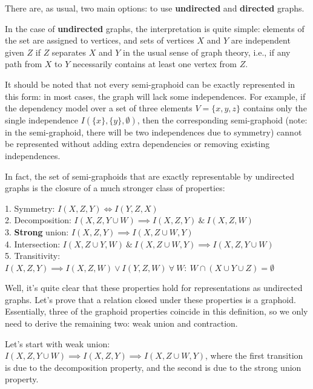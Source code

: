 \documentclass[fleqn]{article}
\numberwithin{equation}{section}
\numberwithin{theorem}{section}
\numberwithin{figure}{section}
\numberwithin{lemma}{section}
\numberwithin{corollary}{section}
\begin{document}
There are, as usual, two main options: to use \textbf{undirected} and \textbf{directed} graphs.

In the case of \textbf{undirected} graphs, the interpretation is quite simple: elements of the set are assigned to vertices, and sets of vertices \( X \) and \( Y \) are independent given \( Z \) if \( Z \) separates \( X \) and \( Y \) in the usual sense of graph theory, i.e., if any path from \( X \) to \( Y \) necessarily contains at least one vertex from \( Z \).

It should be noted that not every semi-graphoid can be exactly represented in this form: in most cases, the graph will lack some independences. For example, if the dependency model over a set of three elements \( V = \{x, y, z\} \) contains only the single independence \( I(\{x\}, \{y\}, \emptyset) \), then the corresponding semi-graphoid (note: in the semi-graphoid, there will be two independences due to symmetry) cannot be represented without adding extra dependencies or removing existing independences.

In fact, the set of semi-graphoids that are exactly representable by undirected graphs is the closure of a much stronger class of properties:

\begin{tcolorbox}
	1. Symmetry: \( I(X, Z, Y) \iff I(Y, Z, X) \) \\
	2. Decomposition: \( I(X, Z, Y \cup W) \implies I(X, Z, Y)\ \&\ I(X, Z, W) \) \\
	3. \textbf{Strong} union: \( I(X, Z, Y) \implies I(X, Z \cup W, Y) \) \\
	4. Intersection: \( I(X, Z \cup Y, W)\ \&\ I(X, Z \cup W, Y) \implies I(X, Z, Y \cup W) \) \\
	5. Transitivity: \( I(X, Z, Y) \implies I(X, Z, W) \lor I(Y, Z, W)\ \forall \ W:\ W \cap (X \cup Y \cup Z) = \emptyset \)
\end{tcolorbox}

Well, it's quite clear that these properties hold for representations as undirected graphs. Let's prove that a relation closed under these properties is a graphoid. Essentially, three of the graphoid properties coincide in this definition, so we only need to derive the remaining two: weak union and contraction.

Let's start with weak union: \( I(X, Z, Y \cup W) \implies I(X, Z, Y) \implies I(X, Z \cup W, Y) \), where the first transition is due to the decomposition property, and the second is due to the strong union property.
\end{document}
